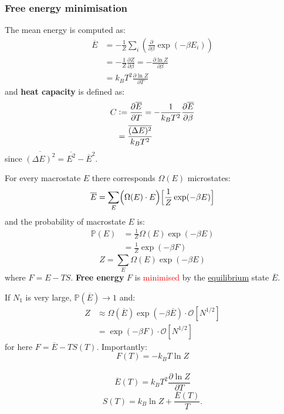 \documentclass{article}
\newcommand{\deq}{\vcentcolon=}
\begin{document}
\begin{multicols*}{3}
\subsubsection*{Free energy minimisation}
The mean energy is computed as:
\begin{align*}
    \overline{E}
    &=-\frac{1}{Z}\sum_i\left(\frac{\partial}{\partial\beta}
    \exp(-\beta E_i)\right) \\
    &=-\frac{1}{Z}\frac{\partial Z}{\partial\beta}
    =-\frac{\partial\ln Z}{\partial\beta} \\
    &=k_B T^2\frac{\partial\ln Z}{\partial T}
\end{align*}
and \textbf{heat capacity} is defined as:
\begin{align*}
    C
    &\deq\frac{\partial\overline{E}}{\partial T}
    =-\frac{1}{k_B T^2}
    \frac{\partial\overline{E}}{\partial\beta} \\
    &=\frac{\overline{(\Delta E)^2}}{k_B T^2}
\end{align*}
since $\overline{(\Delta E)^2}=\overline{E^2}
-\overline{E}^2$.

\newcolumn

For every macrostate $E$ 
there corresponds $\Omega(E)$ microstates:
$$\overline{E}=\sum_{E}\Bigl(\Omega(E)\cdot E\Bigr)
\Bigl[\frac{1}{Z}\exp(-\beta E)\Bigr]$$
and the probability of macrostate $E$ is:
\begin{align*}
    \mathbb{P}(E)
    &=\frac{1}{Z}\Omega(E)\exp(-\beta E) \\
    &=\frac{1}{Z}\exp(-\beta F)
\end{align*}
$$Z=\sum_E\Omega(E)\exp(-\beta E)$$
where $F=E-TS$. \textbf{Free energy} $F$ is
\textcolor{red}{minimised} by the
\underline{equilibrium} state $\overline{E}$.

If $N_1$ is very large, $\mathbb{P}(\overline{E})\rightarrow1$ and:
\begin{align*}
    Z
    &\approx\Omega(\overline{E})\exp(-\beta\overline{E})
    \cdot\mathcal{O}[N^{1/2}] \\
    &=\exp(-\beta F)\cdot\mathcal{O}[N^{1/2}]
\end{align*}
for here $F=\overline{E}-T S(T)$. Importantly:
$$F(T)=-k_B T\ln Z$$\
$$\overline{E}(T)=k_B T^2\frac{\partial\ln Z}{\partial T}$$
$$S(T)=k_B\ln Z+\frac{\overline{E}(T)}{T}.$$

\end{multicols*}
\end{document}
